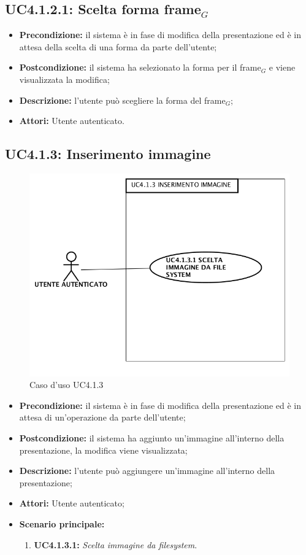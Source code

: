 \subsection{ UC4.1.2.1: Scelta forma frame$_G$}

\begin{itemize}
	\item \textbf{Precondizione:} il sistema è in fase di modifica della presentazione ed è in attesa della scelta di una forma da parte dell'utente;
	\item \textbf{Postcondizione:} il sistema ha selezionato la forma per il frame$_G$ e viene visualizzata la modifica;
	\item \textbf{Descrizione:} l'utente può scegliere la forma del frame$_G$;
	\item \textbf{Attori:} Utente autenticato.
\end{itemize}
\subsection{ UC4.1.3: Inserimento immagine}

\begin{figure}[h]
	\begin{center}
	\includegraphics[scale=0.4]{diagram/UC4-1-3.png}
	\caption{Caso d'uso UC4.1.3}
	\end{center}
\end{figure}
\begin{itemize}
	\item \textbf{Precondizione:} il sistema è in fase di modifica della presentazione ed è in attesa di un'operazione da parte dell'utente;
	\item \textbf{Postcondizione:} il sistema ha aggiunto un'immagine all'interno della presentazione, la modifica viene visualizzata;
	\item \textbf{Descrizione:} l'utente può aggiungere un'immagine all'interno della presentazione;
	\item \textbf{Attori:} Utente autenticato;
	\item \textbf{Scenario principale:}
	\begin{enumerate}
		\item \textbf{ UC4.1.3.1:} \textit{ Scelta immagine da filesystem}.
	\end{enumerate}
\end{itemize}
